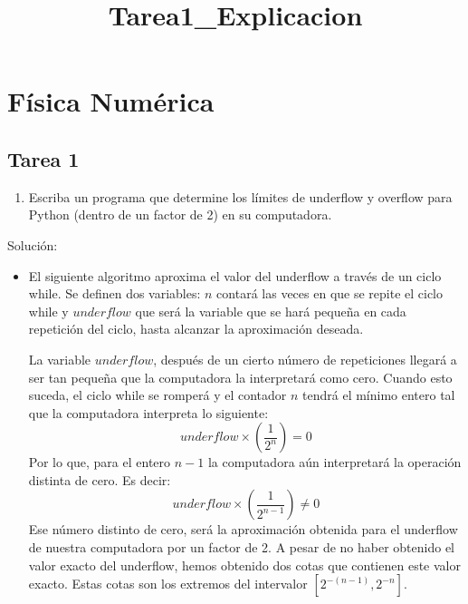 \documentclass[11pt]{article}
\title{Tarea1\_Explicacion}
\providecommand{\tightlist}{%
      \setlength{\itemsep}{0pt}\setlength{\parskip}{0pt}}
\begin{document}
    
    \maketitle
    
    

    
    \hypertarget{fuxedsica-numuxe9rica}{%
\section{Física Numérica}\label{fuxedsica-numuxe9rica}}

    \hypertarget{tarea-1}{%
\subsection{Tarea 1}\label{tarea-1}}

    \begin{enumerate}
\def\labelenumi{\arabic{enumi}.}
\tightlist
\item
  Escriba un programa que determine los límites de underflow y overflow
  para Python (dentro de un factor de 2) en su computadora.
\end{enumerate}

Solución:

\begin{itemize}
\item
  El siguiente algoritmo aproxima el valor del underflow a través de un
  ciclo while. Se definen dos variables: \(n\) contará las veces en que
  se repite el ciclo while y \(underflow\) que será la variable que se
  hará pequeña en cada repetición del ciclo, hasta alcanzar la
  aproximación deseada.

  La variable \(underflow\), después de un cierto número de repeticiones
  llegará a ser tan pequeña que la computadora la interpretará como
  cero. Cuando esto suceda, el ciclo while se romperá y el contador
  \(n\) tendrá el mínimo entero tal que la computadora interpreta lo
  siguiente: \[underflow \times \left(\frac{1}{2^n}\right)= 0\] Por lo
  que, para el entero \(n-1\) la computadora aún interpretará la
  operación distinta de cero. Es decir:
  \[underflow \times \left(\frac{1}{2^{n-1}}\right)\neq 0\] Ese número
  distinto de cero, será la aproximación obtenida para el underflow de
  nuestra computadora por un factor de 2. A pesar de no haber obtenido
  el valor exacto del underflow, hemos obtenido dos cotas que contienen
  este valor exacto. Estas cotas son los extremos del intervalor
  \([2^{-(n-1)},2^{-n}]\).
\end{itemize}
\end{document}
